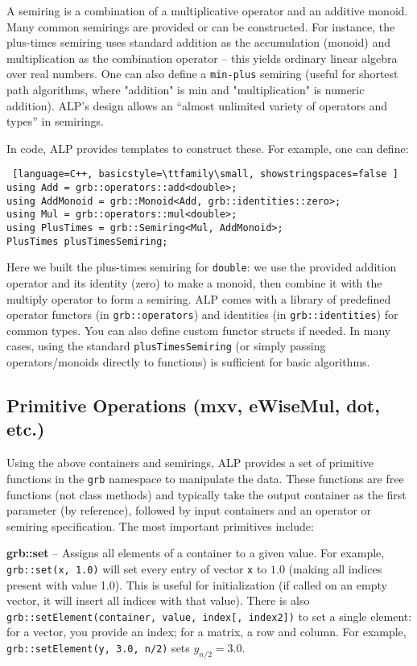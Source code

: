 A semiring is a combination of a multiplicative operator and an additive monoid. Many common semirings are provided or can be constructed. For instance, the plus-times semiring uses standard addition as the accumulation (monoid) and multiplication as the combination operator – this yields ordinary linear algebra over real numbers. One can also define a \texttt{min-plus} semiring (useful for shortest path algorithms, where "addition" is min and "multiplication" is numeric addition). ALP’s design allows an “almost unlimited variety of operators and types” in semirings.

In code, ALP provides templates to construct these. For example, one can define:
\begin{lstlisting} [language=C++, basicstyle=\ttfamily\small, showstringspaces=false ]
using Add = grb::operators::add<double>;
using AddMonoid = grb::Monoid<Add, grb::identities::zero>;
using Mul = grb::operators::mul<double>;
using PlusTimes = grb::Semiring<Mul, AddMonoid>;
PlusTimes plusTimesSemiring;
\end{lstlisting}
Here we built the plus-times semiring for \texttt{double}: we use the provided addition operator and its identity (zero) to make a monoid, then combine it with the multiply operator to form a semiring. ALP comes with a library of predefined operator functors (in \texttt{grb::operators}) and identities (in \texttt{grb::identities}) for common types. You can also define custom functor structs if needed. In many cases, using the standard \texttt{plusTimesSemiring} (or simply passing operators/monoids directly to functions) is sufficient for basic algorithms.

\subsection{Primitive Operations (mxv, eWiseMul, dot, etc.)}

Using the above containers and semirings, ALP provides a set of primitive functions in the \texttt{grb} namespace to manipulate the data. These functions are free functions (not class methods) and typically take the output container as the first parameter (by reference), followed by input containers and an operator or semiring specification. The most important primitives include:

    \textbf{grb::set} – Assigns all elements of a container to a given value. For example, \texttt{grb::set(x, 1.0)} will set every entry of vector \texttt{x} to $1.0$ (making all indices present with value 1.0). This is useful for initialization (if called on an empty vector, it will insert all indices with that value). There is also \texttt{grb::setElement(container, value, index[, index2])} to set a single element: for a vector, you provide an index; for a matrix, a row and column. For example, \texttt{grb::setElement(y, 3.0, n/2)} sets $y_{n/2} = 3.0$.
\newline

